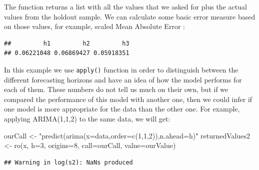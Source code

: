 \documentclass[
]{book}
\newenvironment{Shaded}{\begin{snugshade}}{\end{snugshade}}
\newcommand{\AttributeTok}[1]{\textcolor[rgb]{0.77,0.63,0.00}{#1}}
\newcommand{\ConstantTok}[1]{\textcolor[rgb]{0.00,0.00,0.00}{#1}}
\newcommand{\DecValTok}[1]{\textcolor[rgb]{0.00,0.00,0.81}{#1}}
\newcommand{\FunctionTok}[1]{\textcolor[rgb]{0.00,0.00,0.00}{#1}}
\newcommand{\NormalTok}[1]{#1}
\newcommand{\OtherTok}[1]{\textcolor[rgb]{0.56,0.35,0.01}{#1}}
\newcommand{\SpecialCharTok}[1]{\textcolor[rgb]{0.00,0.00,0.00}{#1}}
\newcommand{\StringTok}[1]{\textcolor[rgb]{0.31,0.60,0.02}{#1}}
\theoremstyle{definition}
\theoremstyle{definition}
\theoremstyle{definition}
\theoremstyle{definition}
\theoremstyle{remark}
\begin{document}
The function returns a list with all the values that we asked for plus the actual values from the holdout sample. We can calculate some basic error measure based on those values, for example, scaled Mean Absolute Error \citep{Petropoulos2015}:

\begin{Shaded}
\end{Shaded}

\begin{verbatim}
##         h1         h2         h3 
## 0.06221048 0.06869427 0.05918351
\end{verbatim}

In this example we use \texttt{apply()} function in order to distinguish between the different forecasting horizons and have an idea of how the model performs for each of them. These numbers do not tell us much on their own, but if we compared the performance of this model with another one, then we could infer if one model is more appropriate for the data than the other one. For example, applying ARIMA(1,1,2) to the same data, we will get:

\begin{Shaded}
\begin{Highlighting}[]
\NormalTok{ourCall }\OtherTok{\textless{}{-}} \StringTok{"predict(arima(x=data,order=c(1,1,2)),n.ahead=h)"}
\NormalTok{returnedValues2 }\OtherTok{\textless{}{-}} \FunctionTok{ro}\NormalTok{(x, }\AttributeTok{h=}\DecValTok{3}\NormalTok{, }\AttributeTok{origins=}\DecValTok{8}\NormalTok{,}
                      \AttributeTok{call=}\NormalTok{ourCall, }\AttributeTok{value=}\NormalTok{ourValue)}
\end{Highlighting}
\end{Shaded}

\begin{verbatim}
## Warning in log(s2): NaNs produced
\end{verbatim}

\begin{Shaded}
\end{Shaded}
\end{document}
